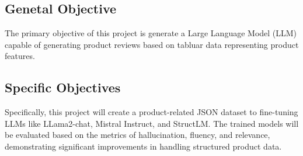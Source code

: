 \subsection*{Genetal Objective}
The primary objective of this project is generate a Large Language Model (LLM) capable of generating product reviews based on tabluar data representing product features. 
\subsection*{Specific Objectives}
Specifically, this project will create a product-related JSON dataset to fine-tuning LLMs like LLama2-chat, Mistral Instruct, and StructLM. The trained models will be evaluated based on the metrics of hallucination, fluency, and relevance, demonstrating significant improvements in handling structured product data.